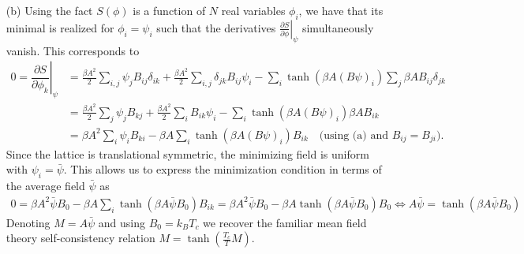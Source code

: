 \documentclass[10pt, a4paper]{article}
\begin{document}
{\begin{enumerate}
  \item[(b)] Using the fact $S(\phi)$ is a function of $N$ real variables $\phi_i$, we have that its minimal is realized for $\phi_i = \psi_i$ such that the derivatives $\left.\frac{\partial S}{\partial \phi}\right|_{\psi}$ simultaneously vanish. This corresponds to 
  \begin{align*}
    0 = \left.\dfrac{\partial S}{\partial \phi_k}\right|_{\psi} &= \frac{\beta A^2}{2} \sum_{i, j} \psi_j B_{ij} \delta_{ik} + \frac{\beta A^2}{2} \sum_{i, j} \delta_{jk} B_{ij} \psi_i -\sum_i \tanh \left(\beta A(B \psi)_i\right) \sum_j \beta A B_{ij} \delta_{jk}\\
    &=  \frac{\beta A^2}{2} \sum_{j} \psi_j B_{kj} + \frac{\beta A^2}{2} \sum_{i} B_{ik} \psi_i -\sum_i \tanh \left(\beta A(B \psi)_i\right) \beta A B_{ik} \\
    &=  \beta A^2 \sum_{i} \psi_i B_{ki}-\beta A \sum_i \tanh \left(\beta A(B \psi)_i\right) B_{ik}\quad \text{(using (a) and $B_{ij} = B_{ji}$)}.
  \end{align*}
  Since the lattice is translational symmetric, the minimizing field is uniform with $\psi_i = \bar{\psi}$. This allows us to express the minimization condition in terms of the average field $\bar{\psi}$ as 
  \begin{align*}
    0 = \beta A^2 \bar{\psi} B_0 -\beta A \sum_i \tanh \left(\beta A \bar{\psi} B_0\right) B_{ik} = \beta A^2 \bar{\psi} B_0 -\beta A \tanh \left(\beta A \bar{\psi} B_0\right) B_0 \iff A \bar{\psi} = \tanh \left(\beta A\bar{\psi} B_0\right) 
  \end{align*}
  Denoting $M = A \bar{\psi}$ and using $B_0 = k_B T_c$ we recover the familiar mean field theory self-consistency relation $M = \tanh \left(\frac{T_c}{T}M\right)$. 
  

\end{enumerate}}
\end{document}
